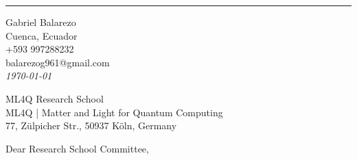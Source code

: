 \documentclass[
	11pt, %
]{letter}
\begin{document}

\vspace*{-1.25cm} %


\vspace{-0.5cm} %

\rule{\linewidth}{1pt} %

\medskip %


\begingroup
	\raggedleft %
	\small %
	Gabriel Balarezo  \\ %
	Cuenca, Ecuador\\ %
	+593 997288232 \\ %
	balarezog961@gmail.com\\ %
	\bigskip %
	{\normalsize\textit{\today}}\\ %
\endgroup


\begingroup
	ML4Q Research School\\
	ML4Q | Matter and Light for Quantum Computing \\
	77, Zülpicher Str., 50937 Köln, Germany\\
\endgroup




Dear Research School Committee,

\smallskip %

\end{document}
